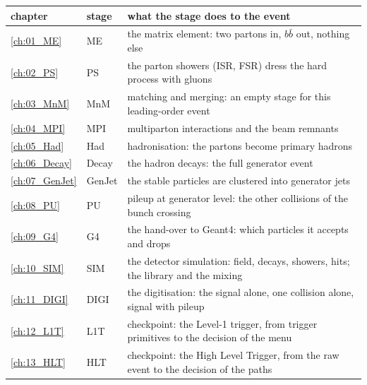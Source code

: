 \documentclass[11pt,a4paper,oneside]{report}
\begin{document}
\begin{center}
\begin{tabular}{@{}llp{8.2cm}@{}}
\toprule
chapter & stage & what the stage does to the event \\
\midrule
\ref{ch:01_ME} & ME & the matrix element: two partons in, $b\bar b$ out, nothing else \\
\ref{ch:02_PS} & PS & the parton showers (ISR, FSR) dress the hard process with gluons \\
\ref{ch:03_MnM} & MnM & matching and merging: an empty stage for this leading-order event \\
\ref{ch:04_MPI} & MPI & multiparton interactions and the beam remnants \\
\ref{ch:05_Had} & Had & hadronisation: the partons become primary hadrons \\
\ref{ch:06_Decay} & Decay & the hadron decays: the full generator event \\
\ref{ch:07_GenJet} & GenJet & the stable particles are clustered into generator jets \\
\ref{ch:08_PU} & PU & pileup at generator level: the other collisions of the bunch crossing \\
\ref{ch:09_G4} & G4 & the hand-over to Geant4: which particles it accepts and drops \\
\ref{ch:10_SIM} & SIM & the detector simulation: field, decays, showers, hits; the library and the mixing \\
\ref{ch:11_DIGI} & DIGI & the digitisation: the signal alone, one collision alone, signal with pileup \\
\ref{ch:12_L1T} & L1T & checkpoint: the Level-1 trigger, from trigger primitives to the decision of the menu \\
\ref{ch:13_HLT} & HLT & checkpoint: the High Level Trigger, from the raw event to the decision of the paths \\
\bottomrule
\end{tabular}
\end{center}

\tableofcontents

%
%
%
%
%
%
%
%


%
%
%
\end{document}
